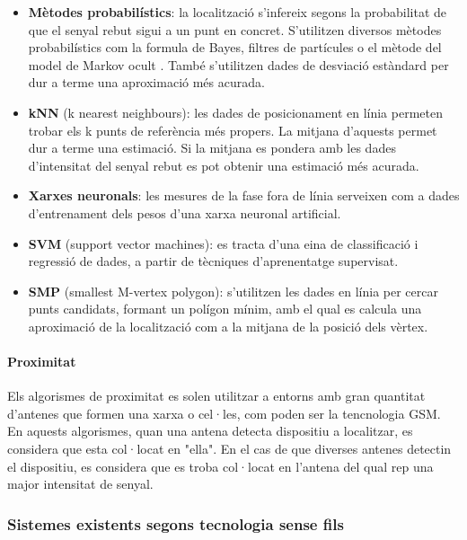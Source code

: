 \begin{itemize}

    \item \textbf{Mètodes probabilístics}: la localització s'infereix segons la probabilitat de que el senyal rebut sigui a un punt en concret. S'utilitzen diversos mètodes probabilístics com la formula de Bayes, filtres de partícules o el mètode del model de Markov ocult \cite{evennou}. També s'utilitzen dades de desviació estàndard per dur a terme una aproximació més acurada.
    \item \textbf{kNN} (k nearest neighbours): les dades de posicionament en línia permeten trobar els k punts de referència més propers. La mitjana d'aquests permet dur a terme una estimació. Si la mitjana es pondera amb les dades d'intensitat del senyal rebut es pot obtenir una estimació més acurada.
    \item \textbf{Xarxes neuronals}: les mesures de la fase fora de línia serveixen com a dades d'entrenament dels pesos d'una xarxa neuronal artificial.
    \item \textbf{SVM} (support vector machines): es tracta d'una eina de classificació i regressió de dades, a partir de tècniques d’aprenentatge supervisat.
    \item \textbf{SMP} (smallest M-vertex polygon): s'utilitzen les dades en línia per cercar punts candidats, formant un polígon mínim, amb el qual es calcula una aproximació de la localització com a la mitjana de la posició dels vèrtex.

\end{itemize}

\paragraph{Proximitat}

Els algorismes de proximitat es solen utilitzar a entorns amb gran quantitat d'antenes que formen una xarxa o cel·les, com poden ser la tencnologia GSM. En aquests algorismes, quan una antena detecta dispositiu a localitzar, es considera que esta col·locat en "ella". En el cas de que diverses antenes detectin el dispositiu, es considera que es troba col·locat en l'antena del qual rep una major intensitat de senyal.

\subsubsection{Sistemes existents segons tecnologia sense fils}

